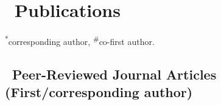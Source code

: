 \newcommand{\Revision}{\textit{under revision}}
\newcommand{\Review}{\textit{under review}}
\newcommand{\Submitted}{\textit{submitted}}
\newcommand{\CS}{\textsuperscript{*}} %
\newcommand{\CF}{\textsuperscript{\#}} %

\section{\texorpdfstring{\faBook\ Publications}{Publications}}
\CS corresponding author, \CF co-first author.

\subsection*{\texorpdfstring{\faBook\ Peer-Reviewed Journal Articles (First/corresponding author)}{Peer-Reviewed Journal Articles (First/corresponding author)}}
